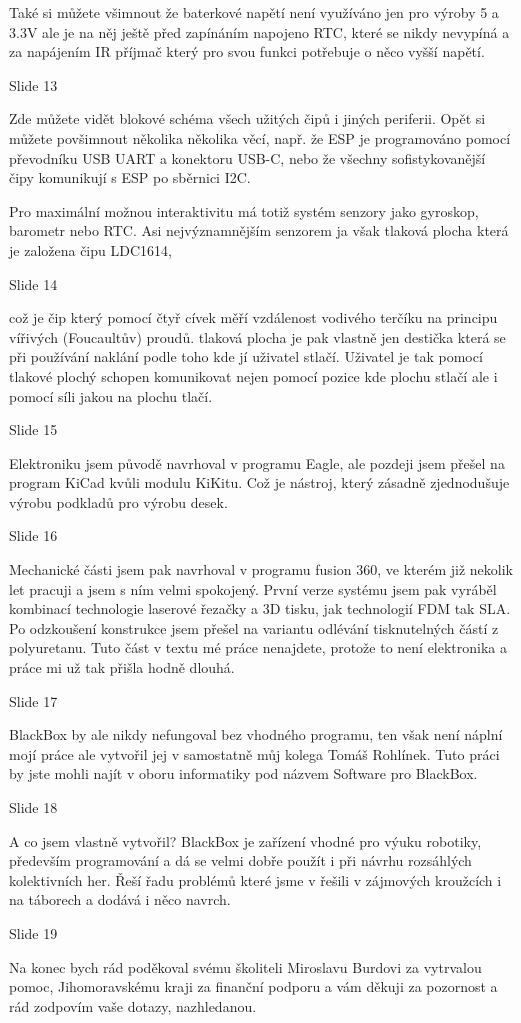 Také si můžete všimnout že baterkové napětí není využíváno jen pro výroby 5 a 3.3V ale je na něj ještě před zapínáním 
napojeno RTC, které se nikdy nevypíná a za napájením IR příjmač který pro svou funkci potřebuje o něco vyšší napětí.


Slide 13

Zde můžete vidět blokové schéma všech užitých čipů i jiných periferii.
Opět si můžete povšimnout několika několika věcí, např. že ESP je programováno pomocí převodníku USB UART a konektoru USB-C,
nebo že všechny sofistykovanější čipy komunikují s ESP po sběrnici I2C.

Pro maximální možnou interaktivitu má totiž systém senzory jako gyroskop, barometr nebo RTC. 
Asi nejvýznamnějším senzorem ja však tlaková plocha která je založena čipu LDC1614, 

Slide 14

což je čip který 
pomocí čtyř cívek měří vzdálenost vodivého terčíku na principu vířivých (Foucaultův) proudů. tlaková plocha je pak vlastně 
jen destička která se při používání naklání podle toho kde jí uživatel stlačí. Uživatel je tak pomocí tlakové plochý
schopen komunikovat nejen pomocí pozice kde plochu stlačí ale i pomocí síli jakou na plochu tlačí. 

Slide 15

Elektroniku jsem původě navrhoval v programu Eagle, ale pozdeji jsem přešel na program KiCad kvůli modulu KiKitu. 
Což je nástroj, který zásadně zjednodušuje výrobu podkladů pro výrobu desek. 

Slide 16

Mechanické části jsem pak navrhoval v programu fusion 360, ve kterém již nekolik let pracuji a jsem s ním velmi spokojený.
První verze systému jsem pak vyráběl kombinací technologie laserové řezačky a 3D tisku, jak technologií FDM tak SLA.
Po odzkoušení konstrukce jsem přešel na variantu odlévání tisknutelných částí z polyuretanu. 
Tuto část v textu mé práce nenajdete, protože
to není elektronika a práce mi už tak přišla hodně dlouhá.

Slide 17

BlackBox by ale nikdy nefungoval bez vhodného programu, ten však není náplní mojí práce ale vytvořil jej v samostatně 
můj kolega Tomáš Rohlínek. Tuto práci by jste mohli najít v oboru informatiky pod názvem Software pro BlackBox.

Slide 18

A co jsem vlastně vytvořil? 
BlackBox je zařízení vhodné pro výuku robotiky, především programování a dá se velmi dobře použít i při návrhu rozsáhlých 
kolektivních her. Řeší řadu problémů které jsme v řešili v zájmových kroužcích i na táborech a dodává i něco navrch.

Slide 19

Na konec bych rád poděkoval svému školiteli Miroslavu Burdovi za vytrvalou pomoc, Jihomoravskému kraji za finanční 
podporu a vám děkuji za pozornost a rád zodpovím vaše dotazy, nazhledanou. 